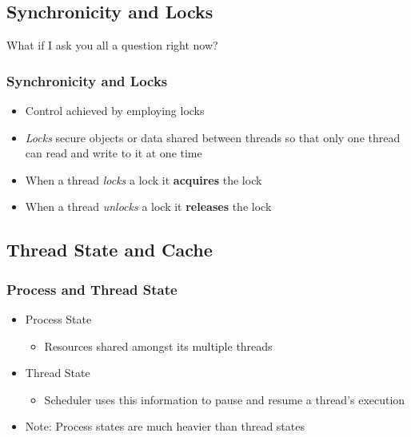 \documentclass{beamer}
\newcommand{\linespace}{\vskip 0.25cm}
\begin{document}
\subsection[Locks]{Synchronicity and Locks}

\begin{frame}
\begin{center}
What if I ask you all a question right now?
\end{center}
\end{frame}

\begin{frame}
\frametitle{Synchronicity and Locks}

\begin{itemize}
	\item Control achieved by employing locks
	
	\linespace
	
	\item \emph{Locks} secure objects or data shared between threads so that only one thread can read and write to it at one time

	\linespace

	\item When a thread \emph{locks} a lock it \textbf{acquires} the lock
	\item When a thread \emph{unlocks} a lock it \textbf{releases} the lock
\end{itemize}
\end{frame}

\subsection[Cache]{Thread State and Cache}

\begin{frame}
\frametitle{Process and Thread State}
\begin{itemize}
\item Process State

\begin{itemize}
	\item[] Resources shared amongst its multiple threads
\end{itemize}

\item Thread State
\begin{itemize}
	\item[] Scheduler uses this information to pause and resume a thread's execution
\end{itemize}

\linespace

\item Note: Process states are much heavier than thread states
\end{itemize}
\end{frame}
\end{document}
